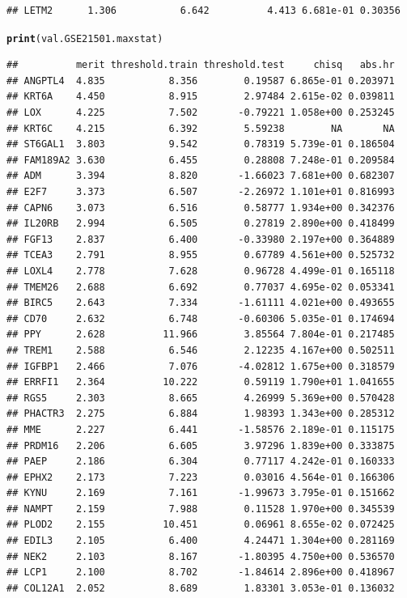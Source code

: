 \documentclass{article}\usepackage[]{graphicx}\usepackage[]{color}
\makeatletter
\newcommand{\hlstd}[1]{\textcolor[rgb]{0.345,0.345,0.345}{#1}}%
\newcommand{\hlkwd}[1]{\textcolor[rgb]{0.737,0.353,0.396}{\textbf{#1}}}%
\newenvironment{kframe}{%
 \def\at@end@of@kframe{}%
 \ifinner\ifhmode%
  \def\at@end@of@kframe{\end{minipage}}%
  \begin{minipage}{\columnwidth}%
 \fi\fi%
 \def\FrameCommand##1{\hskip\@totalleftmargin \hskip-\fboxsep
 \colorbox{shadecolor}{##1}\hskip-\fboxsep
     \hskip-\linewidth \hskip-\@totalleftmargin \hskip\columnwidth}%
 \MakeFramed {\advance\hsize-\width
   \@totalleftmargin\z@ \linewidth\hsize
   \@setminipage}}%
 {\par\unskip\endMakeFramed%
 \at@end@of@kframe}
\newenvironment{knitrout}{}{} %
\makeatother
\begin{document}
\begin{knitrout}
\begin{kframe}
\begin{verbatim}
## LETM2      1.306           6.642          4.413 6.681e-01 0.30356
\end{verbatim}
\begin{alltt}
\hlkwd{print}\hlstd{(val.GSE21501.maxstat)}
\end{alltt}
\begin{verbatim}
##          merit threshold.train threshold.test     chisq   abs.hr
## ANGPTL4  4.835           8.356        0.19587 6.865e-01 0.203971
## KRT6A    4.450           8.915        2.97484 2.615e-02 0.039811
## LOX      4.225           7.502       -0.79221 1.058e+00 0.253245
## KRT6C    4.215           6.392        5.59238        NA       NA
## ST6GAL1  3.803           9.542        0.78319 5.739e-01 0.186504
## FAM189A2 3.630           6.455        0.28808 7.248e-01 0.209584
## ADM      3.394           8.820       -1.66023 7.681e+00 0.682307
## E2F7     3.373           6.507       -2.26972 1.101e+01 0.816993
## CAPN6    3.073           6.516        0.58777 1.934e+00 0.342376
## IL20RB   2.994           6.505        0.27819 2.890e+00 0.418499
## FGF13    2.837           6.400       -0.33980 2.197e+00 0.364889
## TCEA3    2.791           8.955        0.67789 4.561e+00 0.525732
## LOXL4    2.778           7.628        0.96728 4.499e-01 0.165118
## TMEM26   2.688           6.692        0.77037 4.695e-02 0.053341
## BIRC5    2.643           7.334       -1.61111 4.021e+00 0.493655
## CD70     2.632           6.748       -0.60306 5.035e-01 0.174694
## PPY      2.628          11.966        3.85564 7.804e-01 0.217485
## TREM1    2.588           6.546        2.12235 4.167e+00 0.502511
## IGFBP1   2.466           7.076       -4.02812 1.675e+00 0.318579
## ERRFI1   2.364          10.222        0.59119 1.790e+01 1.041655
## RGS5     2.303           8.665        4.26999 5.369e+00 0.570428
## PHACTR3  2.275           6.884        1.98393 1.343e+00 0.285312
## MME      2.227           6.441       -1.58576 2.189e-01 0.115175
## PRDM16   2.206           6.605        3.97296 1.839e+00 0.333875
## PAEP     2.186           6.304        0.77117 4.242e-01 0.160333
## EPHX2    2.173           7.223        0.03016 4.564e-01 0.166306
## KYNU     2.169           7.161       -1.99673 3.795e-01 0.151662
## NAMPT    2.159           7.988        0.11528 1.970e+00 0.345539
## PLOD2    2.155          10.451        0.06961 8.655e-02 0.072425
## EDIL3    2.105           6.400        4.24471 1.304e+00 0.281169
## NEK2     2.103           8.167       -1.80395 4.750e+00 0.536570
## LCP1     2.100           8.702       -1.84614 2.896e+00 0.418967
## COL12A1  2.052           8.689        1.83301 3.053e-01 0.136032

\end{verbatim}
\end{kframe}
\end{knitrout}
\end{document}
